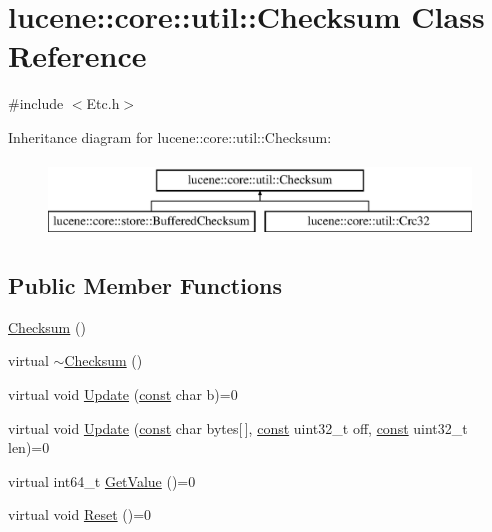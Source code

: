 \hypertarget{classlucene_1_1core_1_1util_1_1Checksum}{}\section{lucene\+:\+:core\+:\+:util\+:\+:Checksum Class Reference}
\label{classlucene_1_1core_1_1util_1_1Checksum}


{\ttfamily \#include $<$Etc.\+h$>$}

Inheritance diagram for lucene\+:\+:core\+:\+:util\+:\+:Checksum\+:\begin{figure}[H]
\begin{center}
\leavevmode
\includegraphics[height=2.000000cm]{classlucene_1_1core_1_1util_1_1Checksum}
\end{center}
\end{figure}
\subsection*{Public Member Functions}
\begin{DoxyCompactItemize}
\item 
\mbox{\hyperlink{classlucene_1_1core_1_1util_1_1Checksum_a2f830ed8572c07dba88d99d41c61e1db}{Checksum}} ()
\item 
virtual \mbox{\hyperlink{classlucene_1_1core_1_1util_1_1Checksum_a792d96bd67cb1691f2afda7fcd431006}{$\sim$\+Checksum}} ()
\item 
virtual void \mbox{\hyperlink{classlucene_1_1core_1_1util_1_1Checksum_a7c6a70391ed64a38eb6f3db43876f652}{Update}} (\mbox{\hyperlink{ZlibCrc32_8h_a2c212835823e3c54a8ab6d95c652660e}{const}} char b)=0
\item 
virtual void \mbox{\hyperlink{classlucene_1_1core_1_1util_1_1Checksum_aab3bdd13efe91e6e582b56fd64a304b6}{Update}} (\mbox{\hyperlink{ZlibCrc32_8h_a2c212835823e3c54a8ab6d95c652660e}{const}} char bytes\mbox{[}$\,$\mbox{]}, \mbox{\hyperlink{ZlibCrc32_8h_a2c212835823e3c54a8ab6d95c652660e}{const}} uint32\+\_\+t off, \mbox{\hyperlink{ZlibCrc32_8h_a2c212835823e3c54a8ab6d95c652660e}{const}} uint32\+\_\+t len)=0
\item 
virtual int64\+\_\+t \mbox{\hyperlink{classlucene_1_1core_1_1util_1_1Checksum_aad9ea66e424c89f3600c36e66cfe508c}{Get\+Value}} ()=0
\item 
virtual void \mbox{\hyperlink{classlucene_1_1core_1_1util_1_1Checksum_a7e2d8a05474cad9ca3d67c1e770ffa29}{Reset}} ()=0
\end{DoxyCompactItemize}


